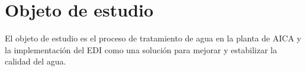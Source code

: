 \section*{Objeto de estudio}
El objeto de estudio es el proceso de tratamiento de agua en la planta de AICA y la implementación del EDI como una solución para mejorar y estabilizar la calidad del agua.